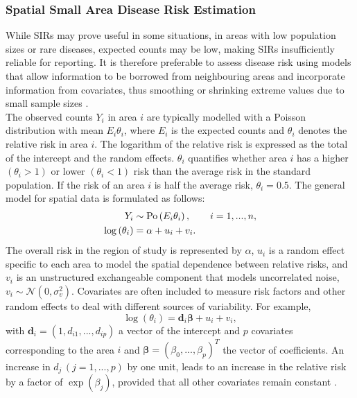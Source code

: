\subsubsection{Spatial Small Area Disease Risk Estimation}\label{sec:spatial}
While SIRs may prove useful in some situations, in areas with low population sizes or rare diseases, expected counts may be low, making SIRs insufficiently reliable for reporting. It is therefore preferable to assess disease risk using models that allow information to be borrowed from neighbouring areas and incorporate information from covariates, thus smoothing or shrinking extreme values due to small sample sizes \autocite[][]{gelfand2010handbook}. \\
The observed counts $Y_i$ in area $i$ are typically modelled with a Poisson distribution with mean $E_i\theta_i$, where $E_i$ is the expected counts and $\theta_i$ denotes the relative risk in area $i$. The logarithm of the relative risk is expressed as the total of the intercept and the random effects. $\theta_i$ quantifies whether area $i$ has a higher $\left(\theta_i >1\right)$ or lower $\left(\theta_i <1\right)$ risk than the average risk in the standard population. If the risk of an area $i$ is half the average risk, $\theta_i = 0.5$. The general model for spatial data is formulated as follows:
\begin{align}
    Y_i&\sim\hbox{Po}\left(E_i\theta_i\right), \hspace{20pt} i=1,...,n,\\
    \log\left(\theta_i\right)&=\alpha+u_i+v_i.
\end{align}
The overall risk in the region of study is represented by $\alpha$, $u_i$ is a random effect specific to each area to model the spatial dependence between relative risks, and $v_i$ is an unstructured exchangeable component that models uncorrelated noise, $v_i\sim\mathcal{N}\left(0,\sigma_v^2\right)$. Covariates are often included to measure risk factors and other random effects to deal with different sources of variability. For example,
\begin{equation*}
    \log\left(\theta_i\right)=\pmb{d}_i\pmb{\beta}+u_i+v_i,
\end{equation*}
with $\pmb{d}_i = \left(1,d_{i1},...,d_{ip}\right)$ a vector of the intercept and $p$ covariates corresponding to the area $i$ and $\pmb{\beta}=\left(\beta_0,...,\beta_p\right)^T$ the vector of coefficients. An increase in $d_j\,\left(j = 1,...,p\right)$ by one unit, leads to an increase in the relative risk by a factor of $\exp\left(\beta_j\right)$, provided that all other covariates remain constant \autocite[][]{moraga2019geospatial}.
\clearpage
